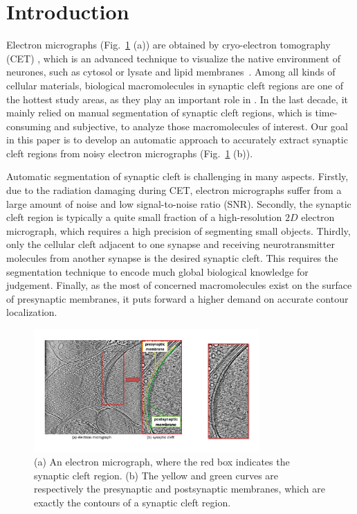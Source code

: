 \section{Introduction}
\label{sec:intro}
Electron micrographs (Fig.~\ref{fig:img} (a)) are obtained by cryo-electron tomography (CET) \cite{Hawkes2007}, which is an advanced technique to visualize the native environment of neurones, such as cytosol or lysate and lipid membranes~\cite{Lucic2005a}.
%
Among all kinds of cellular materials, biological macromolecules in synaptic cleft regions are one of the hottest study areas, as they play an important role in .
%
In the last decade, it mainly relied on manual segmentation of synaptic cleft regions, which is time-consuming and subjective, to analyze those macromolecules of interest.
%
Our goal in this paper is to develop an automatic approach to accurately extract synaptic cleft regions from noisy electron micrographs (Fig.~\ref{fig:img} (b)).


Automatic segmentation of synaptic cleft is challenging in many aspects.
Firstly, due to the radiation damaging during CET, electron micrographs suffer from a large amount of noise and low signal-to-noise ratio (SNR).
Secondly, the synaptic cleft region is typically a quite small fraction of a high-resolution $2D$ electron micrograph, which requires a high precision of segmenting small objects.
Thirdly, only the cellular cleft adjacent to one synapse and receiving neurotransmitter molecules from another synapse is the desired synaptic cleft. This requires the segmentation technique to encode much global biological knowledge for judgement.
Finally, as the most of concerned macromolecules exist on the surface of presynaptic membranes, it puts forward a higher demand on accurate contour localization.

\begin{figure}[t]
    \begin{center}
        \includegraphics[width=3.4in]{figs/FigImg.pdf}
   \end{center}
\caption{(a) An electron micrograph, where the red box indicates the synaptic cleft region.
            (b) The yellow and green curves are respectively the presynaptic and postsynaptic membranes, which are exactly the contours of a synaptic cleft region.  }
\label{fig:img}
\end{figure}


